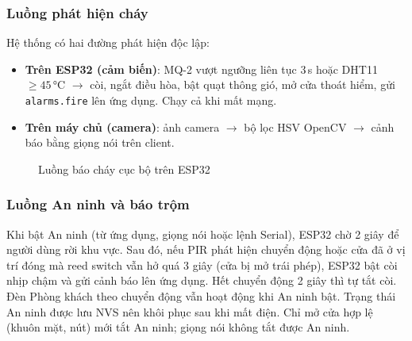 \documentclass[12pt,a4paper]{extarticle}
\begin{document}
\subsubsection{Luồng phát hiện cháy}
Hệ thống có hai đường phát hiện độc lập:
\begin{itemize}
  \item \textbf{Trên ESP32 (cảm biến)}: MQ-2 vượt ngưỡng liên tục 3\,s hoặc DHT11 $\ge 45$\,°C $\rightarrow$ còi, ngắt điều hòa, bật quạt thông gió, mở cửa thoát hiểm, gửi \texttt{alarms.fire} lên ứng dụng. Chạy cả khi mất mạng.
  \item \textbf{Trên máy chủ (camera)}: ảnh camera $\rightarrow$ bộ lọc HSV OpenCV $\rightarrow$ cảnh báo bằng giọng nói trên client.
\end{itemize}

\begin{figure}[H]
\centering
{}
\caption{Luồng báo cháy cục bộ trên ESP32}
\label{fig:baochay}
\end{figure}

\subsubsection{Luồng An ninh và báo trộm}
Khi bật An ninh (từ ứng dụng, giọng nói hoặc lệnh Serial), ESP32 chờ 2 giây để người dùng rời khu vực. Sau đó, nếu PIR phát hiện chuyển động hoặc cửa đã ở vị trí đóng mà reed switch vẫn hở quá 3 giây (cửa bị mở trái phép), ESP32 bật còi nhịp chậm và gửi cảnh báo lên ứng dụng. Hết chuyển động 2 giây thì tự tắt còi. Đèn Phòng khách theo chuyển động vẫn hoạt động khi An ninh bật. Trạng thái An ninh được lưu NVS nên khôi phục sau khi mất điện. Chỉ mở cửa hợp lệ (khuôn mặt, nút) mới tắt An ninh; giọng nói không tắt được An ninh.
\end{document}
